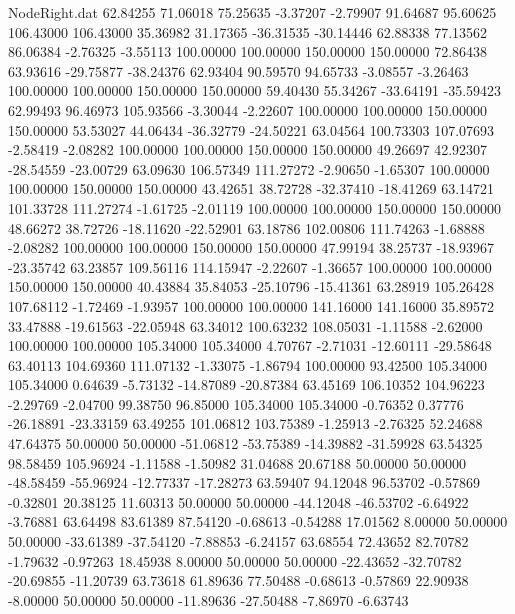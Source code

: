 \begin{filecontents}{NodeRight.dat}
  62.84255   71.06018   75.25635    -3.37207   -2.79907   91.64687   95.60625  106.43000  106.43000   35.36982   31.17365  -36.31535  -30.14446
  62.88338   77.13562   86.06384    -2.76325   -3.55113  100.00000  100.00000  150.00000  150.00000   72.86438   63.93616  -29.75877  -38.24376
  62.93404   90.59570   94.65733    -3.08557   -3.26463  100.00000  100.00000  150.00000  150.00000   59.40430   55.34267  -33.64191  -35.59423
  62.99493   96.46973  105.93566    -3.30044   -2.22607  100.00000  100.00000  150.00000  150.00000   53.53027   44.06434  -36.32779  -24.50221
  63.04564  100.73303  107.07693    -2.58419   -2.08282  100.00000  100.00000  150.00000  150.00000   49.26697   42.92307  -28.54559  -23.00729
  63.09630  106.57349  111.27272    -2.90650   -1.65307  100.00000  100.00000  150.00000  150.00000   43.42651   38.72728  -32.37410  -18.41269
  63.14721  101.33728  111.27274    -1.61725   -2.01119  100.00000  100.00000  150.00000  150.00000   48.66272   38.72726  -18.11620  -22.52901
  63.18786  102.00806  111.74263    -1.68888   -2.08282  100.00000  100.00000  150.00000  150.00000   47.99194   38.25737  -18.93967  -23.35742
  63.23857  109.56116  114.15947    -2.22607   -1.36657  100.00000  100.00000  150.00000  150.00000   40.43884   35.84053  -25.10796  -15.41361
  63.28919  105.26428  107.68112    -1.72469   -1.93957  100.00000  100.00000  141.16000  141.16000   35.89572   33.47888  -19.61563  -22.05948
  63.34012  100.63232  108.05031    -1.11588   -2.62000  100.00000  100.00000  105.34000  105.34000    4.70767   -2.71031  -12.60111  -29.58648
  63.40113  104.69360  111.07132    -1.33075   -1.86794  100.00000   93.42500  105.34000  105.34000    0.64639   -5.73132  -14.87089  -20.87384
  63.45169  106.10352  104.96223    -2.29769   -2.04700   99.38750   96.85000  105.34000  105.34000   -0.76352    0.37776  -26.18891  -23.33159
  63.49255  101.06812  103.75389    -1.25913   -2.76325   52.24688   47.64375   50.00000   50.00000  -51.06812  -53.75389  -14.39882  -31.59928
  63.54325   98.58459  105.96924    -1.11588   -1.50982   31.04688   20.67188   50.00000   50.00000  -48.58459  -55.96924  -12.77337  -17.28273
  63.59407   94.12048   96.53702    -0.57869   -0.32801   20.38125   11.60313   50.00000   50.00000  -44.12048  -46.53702   -6.64922   -3.76881
  63.64498   83.61389   87.54120    -0.68613   -0.54288   17.01562    8.00000   50.00000   50.00000  -33.61389  -37.54120   -7.88853   -6.24157
  63.68554   72.43652   82.70782    -1.79632   -0.97263   18.45938    8.00000   50.00000   50.00000  -22.43652  -32.70782  -20.69855  -11.20739
  63.73618   61.89636   77.50488    -0.68613   -0.57869   22.90938   -8.00000   50.00000   50.00000  -11.89636  -27.50488   -7.86970   -6.63743

\end{filecontents}
